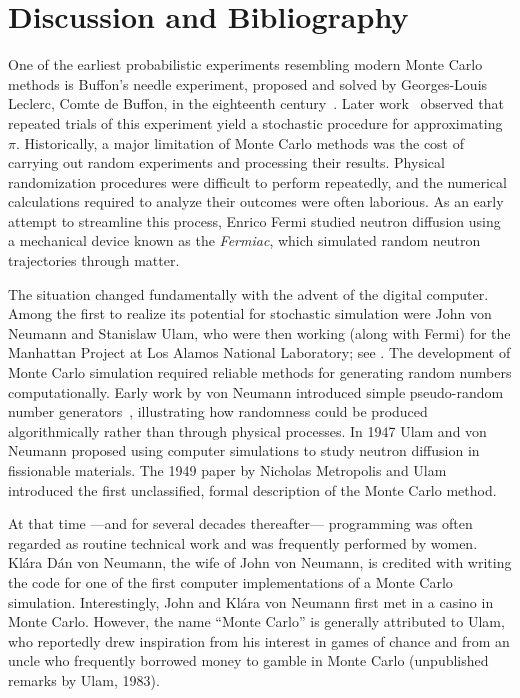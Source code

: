 \section{Discussion and Bibliography}
\label{sec:1.6}

One of the earliest probabilistic experiments resembling modern Monte Carlo methods is Buffon's
needle experiment, proposed and solved by Georges-Louis Leclerc, Comte de Buffon, in the eighteenth
century~\cite{51}. Later work~\cite{134} observed that repeated trials of this experiment yield a
stochastic procedure for approximating $\pi$. Historically, a major limitation of Monte Carlo
methods was the cost of carrying out random experiments and processing their results. Physical
randomization procedures were difficult to perform repeatedly, and the numerical calculations
required to analyze their outcomes were often laborious. As an early attempt to streamline this
process, Enrico Fermi studied neutron diffusion using a mechanical device known as the
\textit{Fermiac}, which simulated random neutron trajectories through matter.

The situation changed fundamentally with the advent of the digital computer. Among the first to
realize its potential for stochastic simulation were John von Neumann and Stanislaw Ulam, who were
then working (along with Fermi) for the Manhattan Project at Los Alamos National Laboratory; see
\cite{67}. The development of Monte Carlo simulation required reliable methods for generating random
numbers computationally. Early work by von Neumann introduced simple pseudo-random number
generators~\cite{232}, illustrating how randomness could be produced algorithmically rather than
through physical processes. In 1947 Ulam and von Neumann proposed using computer simulations to
study neutron diffusion in fissionable materials. The 1949 paper by Nicholas Metropolis and
Ulam~\cite{163} introduced the first unclassified, formal description of the Monte Carlo method.

At that time ---and for several decades thereafter--- programming was often regarded as routine
technical work and was frequently performed by women. Kl\'{a}ra D\'{a}n von Neumann, the wife of
John von Neumann, is credited with writing the code for one of the first computer implementations
of a Monte Carlo simulation. Interestingly, John and Kl\'{a}ra von Neumann first met in a casino in
Monte Carlo. However, the name ``Monte Carlo'' is generally attributed to Ulam, who reportedly drew
inspiration from his interest in games of chance and from an uncle who frequently borrowed money to
gamble in Monte Carlo (unpublished remarks by Ulam, 1983).

